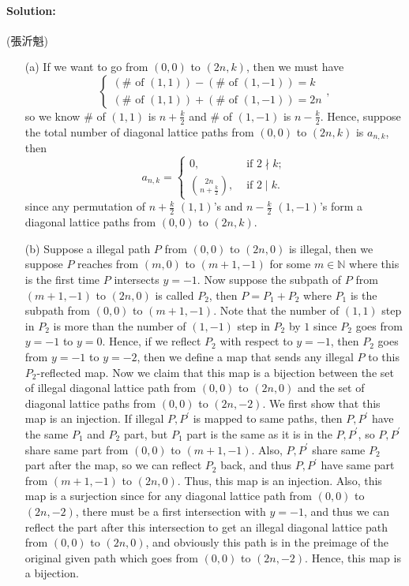 \documentclass[a4paper,12pt]{article}
\begin{document}
\paragraph{Solution:} (張沂魁)
\begin{itemize}
	\item [(a)] If we want to go from \((0,0)\) to \((2n, k)\), then we must have 
	\[
		\begin{cases}
			(\# \text{ of } (1,1)) - (\# \text{ of } (1, - 1)) = k\\
			(\# \text{ of } (1,1)) + (\# \text{ of } (1, -1)) = 2n
		\end{cases},
	\]
	so we know \(\#\) of \((1, 1)\) is \(n + \frac{k}{2}\) and \(\#\) of \((1, -1)\) is \(n - \frac{k}{2}\). Hence, suppose the total number of diagonal lattice paths from \((0, 0)\) to \((2n, k)\) is \(a_{n, k}\), then 
	\[
		a_{n, k} = \begin{cases}
			0, &\text{ if } 2 \nmid k ;\\ \displaystyle
			\binom{2n}{n + \frac{k}{2}}, &\text{ if } 2 \mid k.
		\end{cases}
	\]          
	since any permutation of \(n + \frac{k}{2}\) \((1, 1)\)'s and \(n - \frac{k}{2}\) \((1, -1)\)'s form a diagonal lattice paths from \((0, 0)\) to \((2n, k)\).     
	\item [(b)] Suppose a illegal path \(P\) from \((0, 0)\) to \((2n, 0)\) is illegal, then we suppose \(P\) reaches from \((m, 0)\) to \((m+1, -1)\) for some \(m \in \mathbb{N} \) where this is the first time \(P\) intersects \(y = -1\). Now suppose the subpath of \(P\) from \((m+1, -1)\) to \((2n, 0)\) is called \(P_2\), then \(P = P_1 + P_2\) where \(P_1\) is the subpath from \((0, 0)\) to \((m+1, -1)\). Note that the number of \((1, 1)\) step in \(P_2\) is more than the number of \((1, -1)\) step in \(P_2\) by \(1\) since \(P_2\) goes from \(y=-1\) to \(y=0\). Hence, if we reflect \(P_2\) with respect to \(y = -1\), then \(P_2\) goes from \(y=-1\) to \(y=-2\), then we define a map that sends any illegal \(P\) to this \(P_2\)-reflected map. Now we claim that this map is a bijection between the set of illegal diagonal lattice path from \((0, 0)\) to \((2n, 0)\) and the set of diagonal lattice paths from \((0, 0)\) to \((2n, -2)\). We first show that this map is an injection. If illegal \(P, P^{\prime} \) is mapped to same paths, then \(P, P^{\prime} \) have the same \(P_1\) and \(P_2\) part, but \(P_1\) part is the same as it is in the \(P, P^{\prime} \), so \(P, P^{\prime} \) share same part from \((0, 0)\) to \((m + 1, -1)\). Also, \(P, P^{\prime} \) share same \(P_2\) part after the map, so we can reflect \(P_2\) back, and thus \(P, P^{\prime} \) have same part from \((m+1, -1)\) to \((2n, 0)\). Thus, this map is an injection. Also, this map is a surjection since for any diagonal lattice path from \((0, 0)\) to \((2n, -2)\), there must be a first intersection with \(y=-1\), and thus we can reflect the part after this intersection to get an illegal diagonal lattice path from \((0, 0)\) to \((2n, 0)\), and obviously this path is in the preimage of the original given path which goes from \((0, 0)\) to \((2n, -2)\). Hence, this map is a bijection.                                               

\end{itemize}
\end{document}
